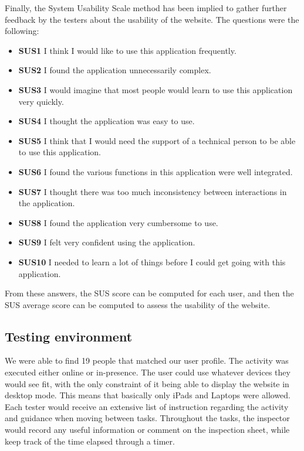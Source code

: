 Finally, the System Usability Scale method has been implied to gather further feedback by the testers about the usability of the website. The questions were the following:
\begin{itemize}
	\item \textbf{SUS1} I think I would like to use this application frequently.
	\item \textbf{SUS2} I found the application unnecessarily complex.
	\item \textbf{SUS3} I would imagine that most people would learn to use this application very quickly.
	\item \textbf{SUS4} I thought the application was easy to use.
	\item \textbf{SUS5} I think that I would need the support of a technical person to be able to use this application.
	\item \textbf{SUS6} I found the various functions in this application were well integrated.
	\item \textbf{SUS7} I thought there was too much inconsistency between interactions in the application.
	\item \textbf{SUS8} I found the application very cumbersome to use.
	\item \textbf{SUS9} I felt very confident using the application.
	\item \textbf{SUS10} I needed to learn a lot of things before I could get going with this application.
\end{itemize}

From these answers, the SUS score can be computed for each user, and then the SUS average score can be computed to assess the usability of the website.

\subsection{Testing environment}
We were able to find 19 people that matched our user profile. The activity was executed either online or in-presence. The user could use whatever devices they would see fit, with the only constraint of it being able to display the website in desktop mode. This means that basically only iPads and Laptops were allowed. Each tester would receive an extensive list of instruction regarding the activity and guidance when moving between tasks. Throughout the tasks, the inspector would record any useful information or comment on the inspection sheet, while keep track of the time elapsed through a timer.

